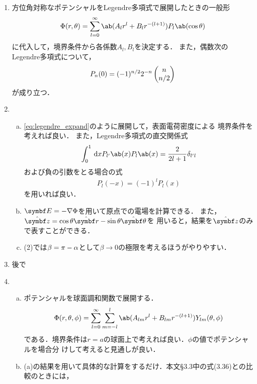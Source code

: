 \begin{enumerate}[label={\large 3.\arabic*}]
  \item 方位角対称なポテンシャルをLegendre多項式で展開したときの一般形
    \begin{gather}%
      \label{eq:legendre_expand}
      \Phi(r,\theta) = \sum_{l=0}^\infty \ab(A_l r^l + B_l r^{-(l+1)}) P_l\ab(\cos\theta)
    \end{gather}%
    に代入して，境界条件から各係数$A_l ,B_l$を決定する．
    また，偶数次のLegendre多項式について，
    \begin{gather}%
      P_n(0) = (-1)^{n/2} 2^{-n} \comb{n}{n/2}
    \end{gather}
    が成り立つ．
  \item 
    \begin{enumerate}[(a)]%
      \item  
        \eqref{eq:legendre_expand}のように展開して，表面電荷密度による
        境界条件を考えれば良い．
        また，Legendre多項式の直交関係式
        \begin{gather}%
          \int_0^1 \dl{x} P_{l'}\ab(x) P_l\ab(x) = \frac{2}{2l+1} \delta_{l'l}
        \end{gather}%
        および負の引数をとる場合の式
        \begin{gather}%
          P_l(-x) =  (-1)^l P_l(x)
        \end{gather}%
        を用いれば良い．
      \item $\bs{E} = -\gr \Phi$を用いて原点での電場を計算できる．
        また，$\hat{\bs{z}} = \cos\theta \hat{\bs{r}} - \sin\theta \hat{\bs{\theta}}$を
        用いると，結果を$\hat{\bs{z}}$のみで表すことができる．
      \item (2)では$\beta = \pi - \alpha$として$\beta \to 0$の極限を考えるほうがやりやすい．
    \end{enumerate}
  \item 後で
  \item 
    \begin{enumerate}[(a)]%
      \item  ポテンシャルを球面調和関数で展開する．
        \begin{gather}%
          \Phi(r,\theta,\phi) = \sum_{l=0}^\infty \sum_{m=-l}^{l} \ab(A_{lm} r^l + B_{lm}r^{-(l+1)}) Y_{lm}(\theta,\phi)
        \end{gather}%
        である．境界条件は$r=a$の球面上で考えれば良い．$\phi$の値でポテンシャルを場合分
        けして考えると見通しが良い．
      \item (a)の結果を用いて具体的な計算をするだけ．本文\S3.3中の式(3.36)との比較のときには，

\end{enumerate}
\end{enumerate}
